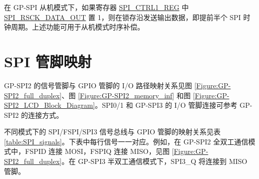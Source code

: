 \documentclass[main\_\_CN.tex]{subfiles}
\begin{document}
在 GP-SPI 从机模式下，如果寄存器 \hyperref[regdesc:SPICTRL1REG]{SPI\_CTRL1\_REG} 中 \hyperref[fielddesc:SPIRSCKDATAOUT]{SPI\_RSCK\_DATA\_OUT} 置 1，则在锁存沿发送输出数据，即提前半个 SPI 时钟周期。上述功能可用于从机模式时序补偿。



\section{SPI 管脚映射} \label{Section:SPI_Pin_Mapping}

GP-SPI2 的信号管脚与 GPIO 管脚的 I/O 路径映射关系见图 \ref{Figure:GP-SPI2_full_duplex}、图 \ref{Figure:GP-SPI2_memory_inf} 和图 \ref{Figure:GP-SPI2_LCD_Block_Diagram}。SPI0/1 和 GP-SPI3 的 I/O 管脚连接可参考 GP-SPI2 的连接方式。

不同模式下的 SPI/FSPI/SPI3 信号总线与 GPIO 管脚的映射关系见表 \ref{table:SPI_signals}。下表中每行信号一一对应。例如，在 GP-SPI2 全双工通信模式中，FSPID 连接 MOSI，FSPIQ 连接 MISO，见图 \ref{Figure:GP-SPI2_full_duplex}。在 GP-SPI3 半双工通信模式下，SPI3\_Q 将连接到 MISO 管脚。
\end{document}
